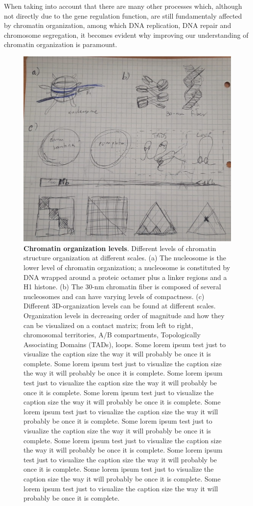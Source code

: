 When taking into account that there are many other processes which, although not directly due to the gene regulation function, are still fundamentaly affected by chromatin organization, among which DNA replication, DNA repair and chromosome segregation, it becomes evident why improving our understanding of chromatin organization is paramount.


\begin{figure}
  \centering
  \includegraphics[width=1\textwidth]{chromatin_organization.jpeg}
  \caption{\textbf{Chromatin organization levels}. Different levels of chromatin structure organization at different scales. (a) The nucleosome is the lower level of chromatin organization; a nucleosome is constituted by DNA wrapped around a proteic octamer plus a linker regions and a H1 histone. (b) The 30-nm chromatin fiber is composed of several nucleosomes and can have varying levels of compactness. (c) Different 3D-organization levels can be found at different scales. Organization levels in decreasing order of magnitude and how they can be visualized on a contact matrix; from left to right, chromosomal territories, A/B compartments, Topologically Associating Domains (TADs), loops. Some lorem ipsum test just to visualize the caption size the way it will probably be once it is complete. Some lorem ipsum test just to visualize the caption size the way it will probably be once it is complete. Some lorem ipsum test just to visualize the caption size the way it will probably be once it is complete. Some lorem ipsum test just to visualize the caption size the way it will probably be once it is complete. Some lorem ipsum test just to visualize the caption size the way it will probably be once it is complete. Some lorem ipsum test just to visualize the caption size the way it will probably be once it is complete. Some lorem ipsum test just to visualize the caption size the way it will probably be once it is complete. Some lorem ipsum test just to visualize the caption size the way it will probably be once it is complete. Some lorem ipsum test just to visualize the caption size the way it will probably be once it is complete. Some lorem ipsum test just to visualize the caption size the way it will probably be once it is complete.}

\end{figure}
